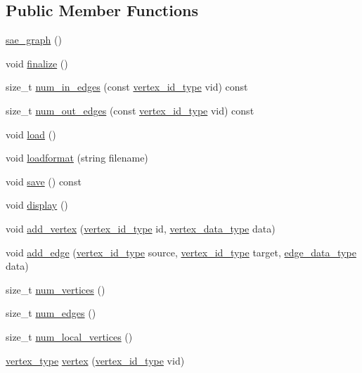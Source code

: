 \subsection*{Public Member Functions}
\begin{DoxyCompactItemize}
\item 
\hyperlink{classsaedb_1_1sae__graph_a80136881b21db9545e5fcc895d0ecaca}{sae\-\_\-graph} ()
\item 
void \hyperlink{classsaedb_1_1sae__graph_acfc9edefe65c3a157535d501561b5773}{finalize} ()
\item 
size\-\_\-t \hyperlink{classsaedb_1_1sae__graph_a0f7e9e6918243d61e43da07170585fbb}{num\-\_\-in\-\_\-edges} (const \hyperlink{classsaedb_1_1sae__graph_a2f9a7bf2db556689f1cd9de9562ff41f}{vertex\-\_\-id\-\_\-type} vid) const 
\item 
size\-\_\-t \hyperlink{classsaedb_1_1sae__graph_acb15e3f2edb026396ebfde5cb0b6062e}{num\-\_\-out\-\_\-edges} (const \hyperlink{classsaedb_1_1sae__graph_a2f9a7bf2db556689f1cd9de9562ff41f}{vertex\-\_\-id\-\_\-type} vid) const 
\item 
void \hyperlink{classsaedb_1_1sae__graph_aa5684a61093a0df5c31526110ed7814a}{load} ()
\item 
void \hyperlink{classsaedb_1_1sae__graph_a63d32eec005ca0781bc929e3228bdbcb}{loadformat} (string filename)
\item 
void \hyperlink{classsaedb_1_1sae__graph_ad7cf419a735a156a86891c9324825848}{save} () const 
\item 
void \hyperlink{classsaedb_1_1sae__graph_a88ff888e84af7136075d6d2203b9acb2}{display} ()
\item 
void \hyperlink{classsaedb_1_1sae__graph_acb0d2162f660d8e842e6e0561fcdc067}{add\-\_\-vertex} (\hyperlink{classsaedb_1_1sae__graph_a2f9a7bf2db556689f1cd9de9562ff41f}{vertex\-\_\-id\-\_\-type} id, \hyperlink{classsaedb_1_1sae__graph_a8e9dfeb979f49c35d427f364fb3f69f5}{vertex\-\_\-data\-\_\-type} data)
\item 
void \hyperlink{classsaedb_1_1sae__graph_af319091f0fa0aad465016dee985e74c6}{add\-\_\-edge} (\hyperlink{classsaedb_1_1sae__graph_a2f9a7bf2db556689f1cd9de9562ff41f}{vertex\-\_\-id\-\_\-type} source, \hyperlink{classsaedb_1_1sae__graph_a2f9a7bf2db556689f1cd9de9562ff41f}{vertex\-\_\-id\-\_\-type} target, \hyperlink{classsaedb_1_1sae__graph_a3f786e0be3d855a988333235a6b50d02}{edge\-\_\-data\-\_\-type} data)
\item 
size\-\_\-t \hyperlink{classsaedb_1_1sae__graph_a78a18f7cb3910f97e055cee6e0425929}{num\-\_\-vertices} ()
\item 
size\-\_\-t \hyperlink{classsaedb_1_1sae__graph_ad5beeb00439d98cfecaf09085caa5f8a}{num\-\_\-edges} ()
\item 
size\-\_\-t \hyperlink{classsaedb_1_1sae__graph_a0b8e3cf5e27545d0f77dd8e856a57af8}{num\-\_\-local\-\_\-vertices} ()
\item 
\hyperlink{structsaedb_1_1sae__graph_1_1vertex__type}{vertex\-\_\-type} \hyperlink{classsaedb_1_1sae__graph_ad669c708cd89709cb522dc79e5f8e797}{vertex} (\hyperlink{classsaedb_1_1sae__graph_a2f9a7bf2db556689f1cd9de9562ff41f}{vertex\-\_\-id\-\_\-type} vid)
\end{DoxyCompactItemize}
